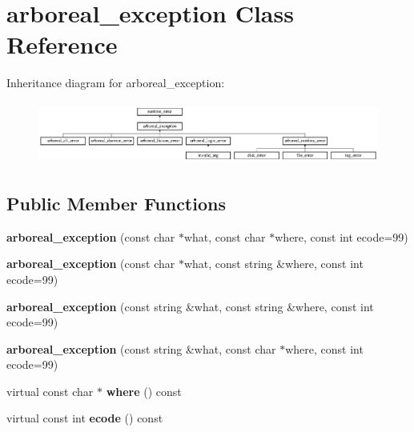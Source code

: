 \hypertarget{classarboreal__exception}{}\section{arboreal\+\_\+exception Class Reference}
\label{classarboreal__exception}
Inheritance diagram for arboreal\+\_\+exception\+:\begin{figure}[H]
\begin{center}
\leavevmode
\includegraphics[height=2.064516cm]{d6/dcf/classarboreal__exception}
\end{center}
\end{figure}
\subsection*{Public Member Functions}
\begin{DoxyCompactItemize}
\item 
\mbox{\label{classarboreal__exception_a11dbf1da86d3d2b3cfee2f3aeb80117b}} 
{\bfseries arboreal\+\_\+exception} (const char $\ast$what, const char $\ast$where, const int ecode=99)
\item 
\mbox{\label{classarboreal__exception_aa5a71af74c46ffa83716fcdfdb6890e5}} 
{\bfseries arboreal\+\_\+exception} (const char $\ast$what, const string \&where, const int ecode=99)
\item 
\mbox{\label{classarboreal__exception_aa5b64424f94fda27c5a4f48a36a3cb8d}} 
{\bfseries arboreal\+\_\+exception} (const string \&what, const string \&where, const int ecode=99)
\item 
\mbox{\label{classarboreal__exception_a0a289978d3da4e38cae543c936ddc176}} 
{\bfseries arboreal\+\_\+exception} (const string \&what, const char $\ast$where, const int ecode=99)
\item 
\mbox{\label{classarboreal__exception_a802003dee586aaeb0b0d7ce909da2dad}} 
virtual const char $\ast$ {\bfseries where} () const
\item 
\mbox{\label{classarboreal__exception_a318e716601c544d92ff9af25edebd725}} 
virtual const int {\bfseries ecode} () const
\end{DoxyCompactItemize}
